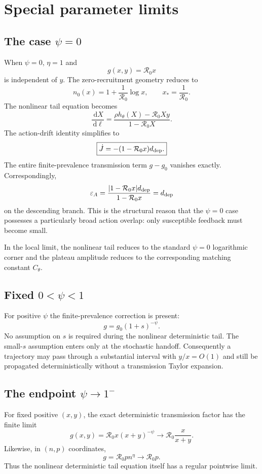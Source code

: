 \documentclass[11pt]{article}
\newcommand{\Rzero}{\mathcal R_0}
\newcommand{\hth}{h_\theta}
\newcommand{\xs}{x_*}
\newcommand{\dd}{\,\mathrm{d}}
\newcommand{\gh}{g_0}
\newcommand{\epsA}{\varepsilon_A}
\begin{document}
\section{Special parameter limits}
\label{sec:limits}

\subsection{The case \texorpdfstring{$\psi=0$}{psi=0}}
When $\psi=0$, $\eta=1$ and
\[
g(x,y)=\Rzero x
\]
is independent of $y$. The zero-recruitment geometry reduces to
\[
n_0(x)=1+\frac1{\Rzero}\log x,
\qquad
\xs=\frac1{\Rzero}.
\]
The nonlinear tail equation becomes
\[
\boxed{
\frac{\dd X}{\dd\ell}
=\frac{\rho\hth(X)-\Rzero Xy}{1-\Rzero X}.
}
\]
The action-drift identity simplifies to
\[
\boxed{
\dot J=-(1-\Rzero x)d_{\rm dep}.
}
\]
The entire finite-prevalence transmission term $g-\gh$ vanishes exactly. Correspondingly,
\[
\epsA
=\frac{|1-\Rzero x|d_{\rm dep}}{1-\Rzero x}=d_{\rm dep}
\]
on the descending branch. This is the structural reason that the $\psi=0$ case possesses a particularly broad action overlap: only susceptible feedback must become small.

In the local limit, the nonlinear tail reduces to the standard $\psi=0$ logarithmic corner and the plateau amplitude reduces to the corresponding matching constant $C_\theta$.

\subsection{Fixed \texorpdfstring{$0<\psi<1$}{0<psi<1}}
For positive $\psi$ the finite-prevalence correction is present:
\[
g=\gh(1+s)^{-\psi}.
\]
No assumption on $s$ is required during the nonlinear deterministic tail. The small-$s$ assumption enters only at the stochastic handoff. Consequently a trajectory may pass through a substantial interval with $y/x=O(1)$ and still be propagated deterministically without a transmission Taylor expansion.

\subsection{The endpoint \texorpdfstring{$\psi\to1^-$}{psi to 1-}}
For fixed positive $(x,y)$, the exact deterministic transmission factor has the finite limit
\[
g(x,y)
=\Rzero x(x+y)^{-\psi}
\longrightarrow
\Rzero\frac{x}{x+y}.
\]
Likewise, in $(n,p)$ coordinates,
\[
g=\Rzero pn^\eta\to\Rzero p.
\]
Thus the nonlinear deterministic tail equation itself has a regular pointwise limit.
\end{document}
